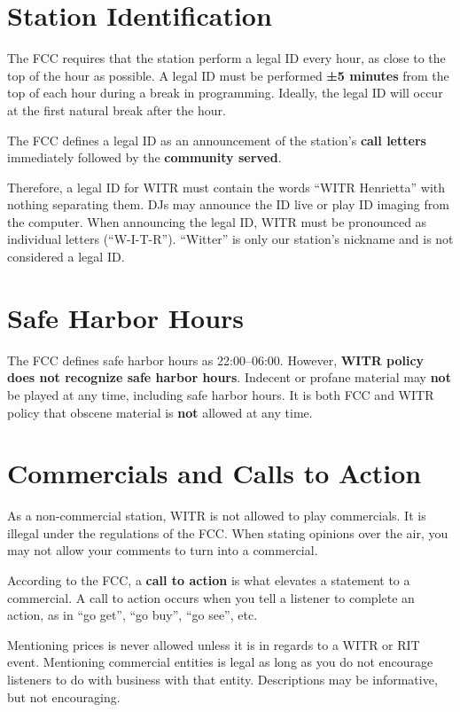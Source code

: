 \documentclass{witrman}
\begin{document}
\section{Station Identification}
The FCC requires that the station perform a legal ID every hour, as close to the
top of the hour as possible. A legal ID must be performed \textbf{±5 minutes}
from the top of each hour during a break in programming. Ideally, the legal ID
will occur at the first natural break after the hour.

The FCC defines a legal ID as an announcement of the station's \textbf{call
letters} immediately followed by the \textbf{community served}.

Therefore, a legal ID for WITR must contain the words ``WITR Henrietta'' with
nothing separating them. DJs may announce the ID live or play ID imaging from
the computer. When announcing the legal ID, WITR must be pronounced as
individual letters (``W-I-T-R''). ``Witter'' is only our station’s nickname and
is not considered a legal ID\@.

\section{Safe Harbor Hours}
The FCC defines safe harbor hours as 22:00--06:00. However, \textbf{WITR policy
does not recognize safe harbor hours}. Indecent or profane material may
\textbf{not} be played at any time, including safe harbor hours. It is both FCC
and WITR policy that obscene material is \textbf{not} allowed at any time.

\section{Commercials and Calls to Action}
As a non-commercial station, WITR is not allowed to play commercials. It is
illegal under the regulations of the FCC\@. When stating opinions over the air,
you may not allow your comments to turn into a commercial.

According to the FCC, a \textbf{call to action} is what elevates a statement to
a commercial. A call to action occurs when you tell a listener to complete an
action, as in ``go get'', ``go buy'', ``go see'', etc.

Mentioning prices is never allowed unless it is in regards to a WITR or RIT
event. Mentioning commercial entities is legal as long as you do not encourage
listeners to do with business with that entity. Descriptions may be informative,
but not encouraging.
\end{document}
